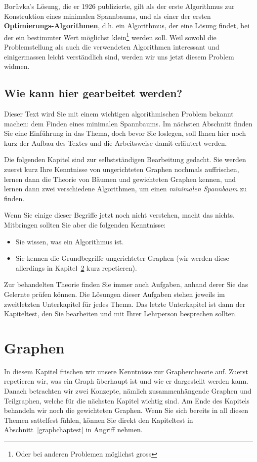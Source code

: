 \documentclass[12pt,a4paper]{report}
\theoremstyle{break}
\theoremstyle{plain}
\begin{document}
Bor\r{u}vka's L\"{o}sung, die er 1926 publizierte, gilt als der erste
Algorithmus zur Konstruktion eines minimalen Spannbaums, und als einer
der ersten \textbf{Optimierungs-Algorithmen}, d.h. ein Algorithmus,
der eine L\"{o}sung findet, bei der ein bestimmter Wert m\"{o}glichst
klein\footnote{Oder bei anderen Problemen m\"{o}glichst gross} werden soll. Weil sowohl
die Problemstellung als auch die verwendeten Algorithmen interessant
und einigermassen leicht verst\"{a}ndlich sind, werden wir uns jetzt diesem Problem widmen.
\section{Wie kann hier gearbeitet werden?}

Dieser Text wird Sie mit einem wichtigen algorithmischen Problem
bekannt machen: dem Finden eines minimalen Spannbaums. Im n\"{a}chsten
Abschnitt finden Sie eine Einf\"{u}hrung in das Thema, doch bevor
Sie loslegen, soll Ihnen hier noch kurz der Aufbau des Textes und die
Arbeitsweise damit erl\"{a}utert werden.

Die folgenden Kapitel sind zur selbstst\"{a}ndigen Bearbeitung
gedacht. Sie werden zuerst kurz Ihre Kenntnisse von ungerichteten
Graphen nochmals auffrischen, lernen dann die Theorie von B\"{a}umen
und gewichteten Graphen kennen, und lernen dann zwei verschiedene
Algorithmen, um einen \emph{minimalen Spannbaum} zu finden.
 
Wenn Sie einige dieser Begriffe jetzt noch nicht verstehen, macht das
nichts. Mitbringen sollten Sie aber die folgenden Kenntnisse:

\begin{itemize}
\item Sie wissen, was ein Algorithmus ist.
\item Sie kennen die Grundbegriffe ungerichteter Graphen (wir werden
  diese allerdings in Kapitel~\ref{graphs} kurz repetieren).
\end{itemize}

Zur behandelten Theorie finden Sie immer auch Aufgaben, anhand derer
Sie das Gelernte pr\"{u}fen k\"{o}nnen. Die L\"{o}sungen dieser Aufgaben stehen
jeweils im zweitletzten Unterkapitel f\"{u}r jedes Thema. Das letzte
Unterkapitel ist dann der Kapiteltest, den Sie bearbeiten und mit
Ihrer Lehrperson besprechen sollten.

\newpage
\chapter{Graphen}
\label{graphs}
In diesem Kapitel frischen wir unsere Kenntnisse zur Graphentheorie
auf. Zuerst repetieren wir, was ein Graph \"{u}berhaupt ist und wie er
dargestellt werden kann. Danach betrachten wir zwei Konzepte,
n\"{a}mlich zusammenh\"{a}ngende Graphen und Teilgraphen, welche
f\"{u}r die n\"{a}chsten Kapitel wichtig sind. Am Ende des Kapitels
behandeln wir noch die gewichteten Graphen. Wenn Sie sich bereits
in all diesen Themen sattelfest f\"{u}hlen, k\"{o}nnen Sie direkt den
Kapiteltest in Abschnitt~\ref{graphchaptest} in Angriff nehmen.
\end{document}
